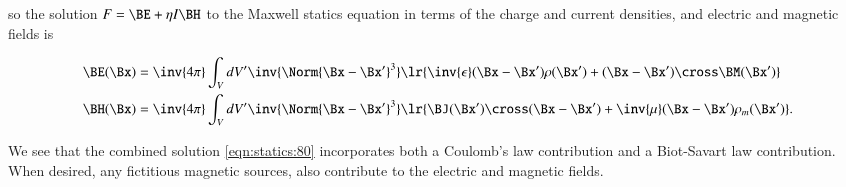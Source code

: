 so the solution \( F = \BE + \eta I \BH \) to the Maxwell statics equation in terms of the charge and current densities, and electric and magnetic fields is

\begin{dmath}\label{eqn:statics:100}
\begin{aligned}
\BE(\Bx)
&=
\inv{4\pi} \int_V dV' \inv{\Norm{\Bx - \Bx'}^3}
\lr{
   \inv{\epsilon}(\Bx - \Bx') \rho(\Bx')
   +
   (\Bx - \Bx') \cross \BM(\Bx')
} \\
\BH(\Bx)
&=
\inv{4\pi} \int_V dV' \inv{\Norm{\Bx - \Bx'}^3}
\lr{
  \BJ(\Bx') \cross (\Bx - \Bx')
+ \inv{\mu} (\Bx - \Bx') \rho_m(\Bx')
}.
\end{aligned}
\end{dmath}

We see that the combined solution \cref{eqn:statics:80} incorporates both a Coulomb's law contribution and a Biot-Savart law contribution.
When desired, any fictitious magnetic sources, also contribute to the electric and magnetic fields.


